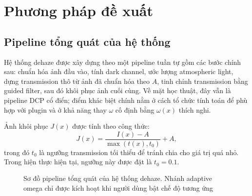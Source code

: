 \newpage
\section{Phương pháp đề xuất}

\subsection{Pipeline tổng quát của hệ thống}

Hệ thống dehaze được xây dựng theo một pipeline tuần tự gồm các bước chính sau: chuẩn hóa ảnh đầu vào, tính dark channel, ước lượng atmospheric light, dựng transmission thô từ ảnh đã chuẩn hóa theo \(A\), tinh chỉnh transmission bằng guided filter, sau đó khôi phục ảnh cuối cùng. Về mặt học thuật, đây vẫn là pipeline DCP cổ điển; điểm khác biệt chính nằm ở cách tổ chức tính toán để phù hợp với plugin và ở khả năng thay \(\omega\) cố định bằng \(\omega(x)\) thích nghi.

Ảnh khôi phục \(J(x)\) được tính theo công thức:
\begin{equation}
J(x)=\frac{I(x)-A}{\max(t(x),t_0)}+A,
\end{equation}
trong đó \(t_0\) là ngưỡng transmission tối thiểu để tránh chia cho giá trị quá nhỏ. Trong hiện thực hiện tại, ngưỡng này được đặt là \(t_0 = 0.1\).

\begin{figure}[H]
  \centering
  \caption{Sơ đồ pipeline tổng quát của hệ thống dehaze. Nhánh adaptive omega chỉ được kích hoạt khi người dùng bật chế độ tương ứng}
\end{figure}


